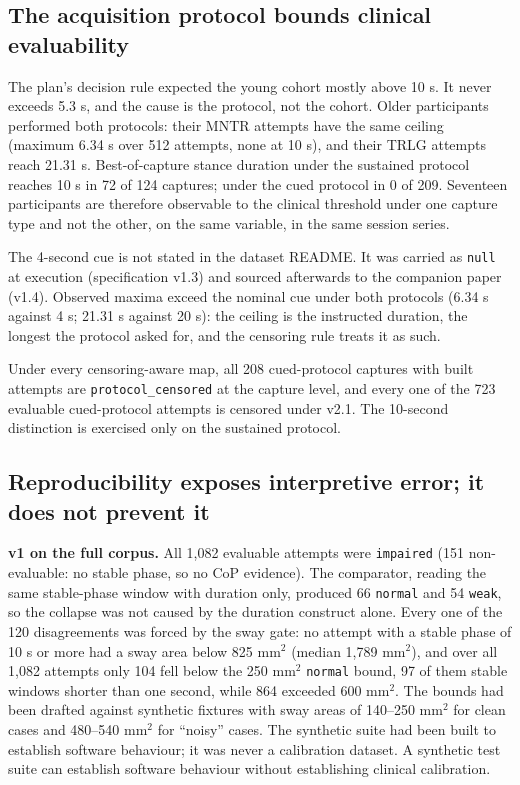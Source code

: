 \documentclass[11pt]{article}
\begin{document}
\subsection{The acquisition protocol bounds clinical evaluability}\label{the-acquisition-protocol-bounds-clinical-evaluability}

The plan's decision rule expected the young cohort mostly above 10 s. It never exceeds 5.3 s, and the cause is the protocol, not the cohort. Older participants performed both protocols: their MNTR attempts have the same ceiling (maximum 6.34 s over 512 attempts, none at 10 s), and their TRLG attempts reach 21.31 s. Best-of-capture stance duration under the sustained protocol reaches 10 s in 72 of 124 captures; under the cued protocol in 0 of 209. Seventeen participants are therefore observable to the clinical threshold under one capture type and not the other, on the same variable, in the same session series.

The 4-second cue is not stated in the dataset README. It was carried as \texttt{null} at execution (specification v1.3) and sourced afterwards to the companion paper (v1.4). Observed maxima exceed the nominal cue under both protocols (6.34 s against 4 s; 21.31 s against 20 s): the ceiling is the instructed duration, the longest the protocol asked for, and the censoring rule treats it as such.

Under every censoring-aware map, all 208 cued-protocol captures with built attempts are \texttt{protocol\_censored} at the capture level, and every one of the 723 evaluable cued-protocol attempts is censored under v2.1. The 10-second distinction is exercised only on the sustained protocol.

\subsection{Reproducibility exposes interpretive error; it does not prevent it}\label{reproducibility-exposes-interpretive-error-it-does-not-prevent-it}

\textbf{v1 on the full corpus.} All 1,082 evaluable attempts were \texttt{impaired} (151 non-evaluable: no stable phase, so no CoP evidence). The comparator, reading the same stable-phase window with duration only, produced 66 \texttt{normal} and 54 \texttt{weak}, so the collapse was not caused by the duration construct alone. Every one of the 120 disagreements was forced by the sway gate: no attempt with a stable phase of 10 s or more had a sway area below 825 mm$^{2}$ (median 1,789 mm$^{2}$), and over all 1,082 attempts only 104 fell below the 250 mm$^{2}$ \texttt{normal} bound, 97 of them stable windows shorter than one second, while 864 exceeded 600 mm$^{2}$. The bounds had been drafted against synthetic fixtures with sway areas of 140--250 mm$^{2}$ for clean cases and 480--540 mm$^{2}$ for ``noisy'' cases. The synthetic suite had been built to establish software behaviour; it was never a calibration dataset. A synthetic test suite can establish software behaviour without establishing clinical calibration.
\end{document}
